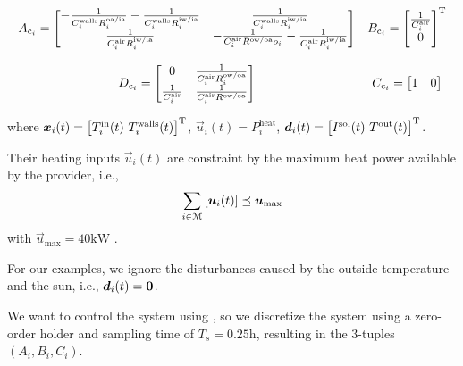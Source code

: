 \documentclass[../main.tex]{subfiles}
\begin{document}
\begin{equation}
  \label{eq:4}
  \begin{matrix}
    A_{\mathrm{c}_{i}}=\left[
    \begin{matrix}
      -\frac{1}{C^{\text{walls}}_{i}R^{\text{oa/ia}}_{i}}-\frac{1}{C^{\text{walls}}_{i}R^{\text{iw/ia}}_{i}}& \frac{1}{C^{\text{walls}}_{i}R^{\text{iw/ia}}_{i}}\\
      \frac{1}{C^{\text{air}}_{i}R^{\text{iw/ia}}_{i}} &-\frac{1}{C^{\text{air}}_{i}R^{\text{ow/oa}}o_{i}}-\frac{1}{C^{\text{air}}_{i}R^{\text{iw/ia}}_{i}}
    \end{matrix}\right]
                                                         &
      B_{\mathrm{c}_{i}}=\left[\begin{matrix}  \frac{1}{C^{\text{air}}_{i}}\\ 0\end{matrix}\right]^{\mathrm{T}}
  \\\\
    D_{\mathrm{c}_{i}}=\left[
    \begin{matrix}
      0& \frac{1}{C^{\text{air}}_{i}R^{\text{ow/oa}}_{i}}\\
      \frac{1}{C^{\text{air}}_{i}} &\frac{1}{C^{\text{air}}_{i}R^{\text{ow/oa}}}
    \end{matrix}\right]&C_{\mathrm{c}_{i}}=\left[\begin{matrix}1 & 0\end{matrix}\right]

\end{matrix}
\end{equation}

where
${\vec{x}_{i}(t)=\left[T^{\text{in}}_{i}(t)\ T^{\text{walls}}_{i}(t)\right]\T}$,
${\vec{u}_{i}(t)=P^{\text{heat}}_{i}}$,
${\vec{d}_{i}(t)=\left[I^{\text{sol}}(t)\ T^{\text{out}}(t)\right]\T}$.

Their heating inputs $\vec{u}_{i}(t)$ are constraint by the maximum heat power available by the provider, i.e.,
\begin{equation}
\sum\limits_{i\in\mathcal{M}}\left[\boldsymbol{u}_{i}(t)\right]\preceq \boldsymbol{u}_{\max}
\end{equation}
with
$\vec{u}_{\max}=40\mathrm{kW}$
.

\begin{remark}
  For our examples, we ignore the disturbances caused by the outside temperature and the sun, i.e., $\boldsymbol{d}_{i}(t)=\mathbf{0}$.
\end{remark}

We want to control the system using \mpc{}, so we discretize the system using a zero-order holder and sampling time of $T_{s}=0.25\mathrm{h}$, resulting in the $3$-tuples $(A_{i},B_{i},C_{i})$.
\end{document}
